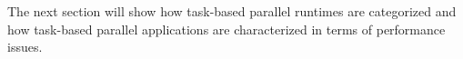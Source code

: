 The next section will show how task-based parallel runtimes are categorized and how task-based parallel applications are characterized in terms of performance issues.


